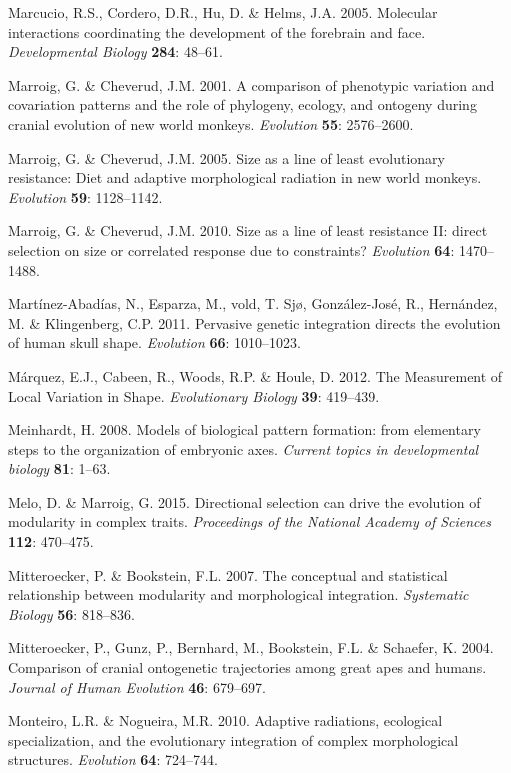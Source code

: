 \documentclass[12pt,]{article}
\begin{document}
Marcucio, R.S., Cordero, D.R., Hu, D. \& Helms, J.A. 2005. Molecular
interactions coordinating the development of the forebrain and face.
\emph{Developmental Biology} \textbf{284}: 48--61.

Marroig, G. \& Cheverud, J.M. 2001. A comparison of phenotypic variation
and covariation patterns and the role of phylogeny, ecology, and
ontogeny during cranial evolution of new world monkeys. \emph{Evolution}
\textbf{55}: 2576--2600.

Marroig, G. \& Cheverud, J.M. 2005. Size as a line of least evolutionary
resistance: Diet and adaptive morphological radiation in new world
monkeys. \emph{Evolution} \textbf{59}: 1128--1142.

Marroig, G. \& Cheverud, J.M. 2010. Size as a line of least resistance
II: direct selection on size or correlated response due to constraints?
\emph{Evolution} \textbf{64}: 1470--1488.

Martínez-Abadías, N., Esparza, M., vold, T. Sjø, González-José, R.,
Hernández, M. \& Klingenberg, C.P. 2011. Pervasive genetic integration
directs the evolution of human skull shape. \emph{Evolution}
\textbf{66}: 1010--1023.

Márquez, E.J., Cabeen, R., Woods, R.P. \& Houle, D. 2012. The
Measurement of Local Variation in Shape. \emph{Evolutionary Biology}
\textbf{39}: 419--439.

Meinhardt, H. 2008. Models of biological pattern formation: from
elementary steps to the organization of embryonic axes. \emph{Current
topics in developmental biology} \textbf{81}: 1--63.

Melo, D. \& Marroig, G. 2015. Directional selection can drive the
evolution of modularity in complex traits. \emph{Proceedings of the
National Academy of Sciences} \textbf{112}: 470--475.

Mitteroecker, P. \& Bookstein, F.L. 2007. The conceptual and statistical
relationship between modularity and morphological integration.
\emph{Systematic Biology} \textbf{56}: 818--836.

Mitteroecker, P., Gunz, P., Bernhard, M., Bookstein, F.L. \& Schaefer,
K. 2004. Comparison of cranial ontogenetic trajectories among great apes
and humans. \emph{Journal of Human Evolution} \textbf{46}: 679--697.

Monteiro, L.R. \& Nogueira, M.R. 2010. Adaptive radiations, ecological
specialization, and the evolutionary integration of complex
morphological structures. \emph{Evolution} \textbf{64}: 724--744.
\end{document}
